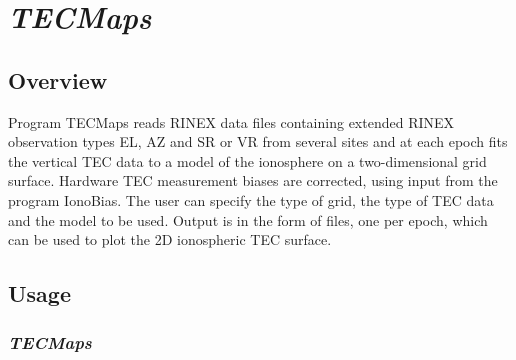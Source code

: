 %
%


\section{\emph{TECMaps}}
\subsection{Overview}
Program TECMaps reads RINEX data files containing extended RINEX observation types EL, AZ and SR or VR from several sites and at each epoch fits the vertical TEC data to a model of the ionosphere on a two-dimensional grid surface. Hardware TEC measurement biases are corrected, using input from the program IonoBias. The user can specify the type of grid, the type of TEC data and the model to be used. Output is in the form of files, one per epoch, which can be used to plot the 2D ionospheric TEC surface.
\subsection{Usage}
\subsubsection{\emph{TECMaps}}

